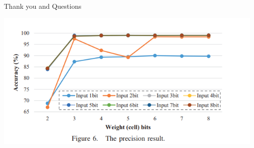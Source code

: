 \documentclass[hyperref={colorlinks}]{beamer}
\begin{document}
\begin{frame}
	\Huge{\centerline{Thank you and Questions}}
\end{frame}

\begin{frame}
	\includegraphics[scale=0.4]{precision_graph.png}
\end{frame}
\end{document}
